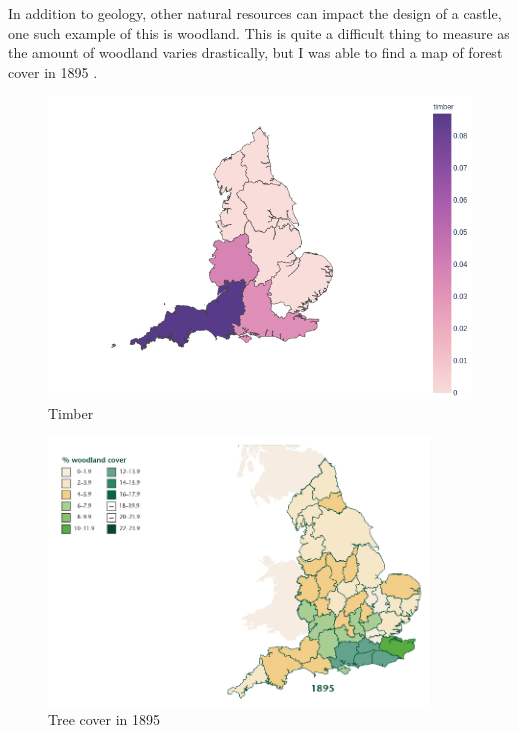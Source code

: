 \documentclass[12pt]{article}
\begin{document}
In addition to geology, other natural resources can impact the design of a castle, one such example of this is woodland. This is quite a difficult thing to measure as the amount of woodland varies drastically, but I was able to find a map of forest cover in 1895 \cite{trees}.

\begin{minipage}{0.45\textwidth}
	\begin{figure}[H]
		\centering
		\includegraphics[width=\textwidth]{timber.png}
		\caption{Timber}
	\end{figure}
\end{minipage}
\begin{minipage}{0.45\textwidth}
	\begin{figure}[H]
		\centering
		\includegraphics[width=0.9\textwidth]{forest_cover.png}
		\caption{Tree cover in 1895}
	\end{figure}
\end{minipage}
\end{document}
